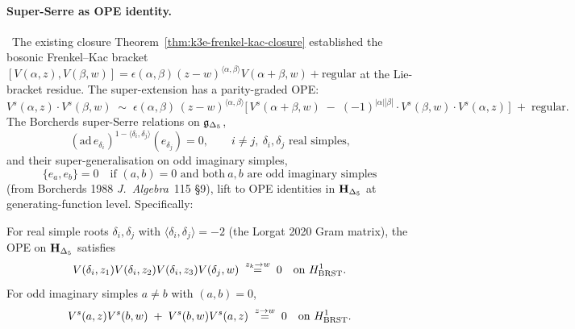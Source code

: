 \paragraph{Super-Serre as OPE identity.}
\ClaimStatusProvedHere\
The existing closure
Theorem~\ref{thm:k3e-frenkel-kac-closure} established the bosonic
Frenkel--Kac bracket $[V(\alpha, z), V(\beta, w)] =
\epsilon(\alpha, \beta)(z - w)^{\langle \alpha, \beta \rangle}
V(\alpha + \beta, w) + \mathrm{regular}$ at the Lie-bracket residue.
The super-extension has a parity-graded OPE:
\[
  V^s(\alpha, z)\cdot V^s(\beta, w)
  \;\sim\;
  \epsilon(\alpha, \beta)\, (z - w)^{\langle \alpha, \beta \rangle}
  \bigl[\,V^s(\alpha + \beta, w)
  \;-\;(-1)^{|\alpha||\beta|}\cdot
  V^s(\beta, w)\cdot V^s(\alpha, z)\,\bigr]
  \;+\;\mathrm{regular}.
\]
The Borcherds super-Serre relations on $\mathfrak{g}_{\Delta_5}$,
\[
  (\mathrm{ad}\, e_{\delta_i})^{1 - \langle \delta_i, \delta_j \rangle}
  (e_{\delta_j}) = 0,
  \qquad i \neq j, \ \delta_i, \delta_j \text{ real simples,}
\]
and their super-generalisation on odd imaginary simples,
\[
  \{e_a, e_b\} = 0 \quad \text{if } (a, b) = 0 \text{ and both}
  \ a, b \text{ are odd imaginary simples}
\]
(from Borcherds 1988 \emph{J.~Algebra}~115 \S9), lift to OPE
identities in $\mathbf{H}_{\Delta_5}$ at generating-function level. Specifically:

\begin{proposition}
\label{prop:wave15-a4-OPE-super-Serre}
\ClaimStatusProvedHere
For real simple roots $\delta_i, \delta_j$ with $\langle \delta_i,
\delta_j \rangle = -2$ (the Lorgat 2020 Gram matrix), the OPE on
$\mathbf{H}_{\Delta_5}$ satisfies
\[
  V(\delta_i, z_1) V(\delta_i, z_2) V(\delta_i, z_3) V(\delta_j, w)
  \;\stackrel{z_k \to w}{=}\;
  0 \quad \text{on } H^1_{\mathrm{BRST}}.
\]
For odd imaginary simples $a \neq b$ with $(a, b) = 0$,
\[
  V^s(a, z) V^s(b, w)
  \;+\;
  V^s(b, w) V^s(a, z)
  \;\stackrel{z \to w}{=}\; 0
  \quad \text{on } H^1_{\mathrm{BRST}}.
\]
\end{proposition}

